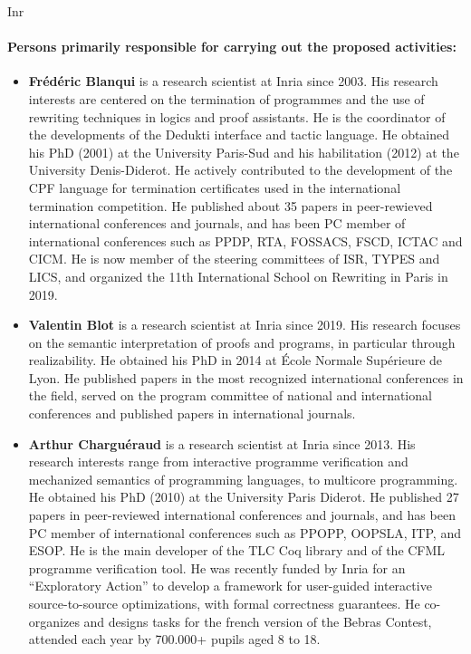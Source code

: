 \begin{sitedescription}{Inr}

\paragraph{Persons primarily responsible for carrying out the proposed activities:}

\begin{itemize} %

\item{\bf Frédéric Blanqui} is a research scientist at Inria since 2003. His research interests are centered on the termination of programmes and the use of rewriting techniques in logics and proof assistants. He is the coordinator of the developments of the Dedukti interface and tactic language. He obtained his PhD (2001) at the University Paris-Sud and his habilitation (2012) at the University Denis-Diderot. He actively contributed to the development of the CPF language for termination certificates used in the international termination competition. He published about 35 papers in peer-rewieved international conferences and journals, and has been PC member of international conferences such as PPDP, RTA, FOSSACS, FSCD, ICTAC and CICM. He is now member of the steering committees of ISR, TYPES and LICS, and organized the 11th International School on Rewriting in Paris in 2019.

\item{\bf Valentin Blot} is a research scientist at Inria since 2019. His research focuses on the semantic interpretation of proofs and programs, in particular through realizability. He obtained his PhD in 2014 at \'Ecole Normale Sup\'erieure de Lyon. He published papers in the most recognized international conferences in the field, served on the program committee of national and international conferences and published papers in international journals.

\item{\bf Arthur Charguéraud} is a research scientist at Inria since 2013.
His research interests range from interactive programme verification and mechanized
semantics of programming languages, to multicore programming.
He obtained his PhD (2010) at the University Paris Diderot. He published 27 papers
in peer-reviewed international conferences and journals, and has been PC member
of international conferences such as PPOPP, OOPSLA, ITP, and ESOP. He is the main
developer of the TLC Coq library and of the CFML programme verification tool.
He was recently funded by Inria for an ``Exploratory Action'' to develop a framework
for user-guided interactive source-to-source optimizations, with formal correctness
guarantees.
He co-organizes and designs tasks for the french version of the Bebras Contest,
attended each year by 700.000+ pupils aged 8 to 18.



\end{itemize}
\end{sitedescription}
